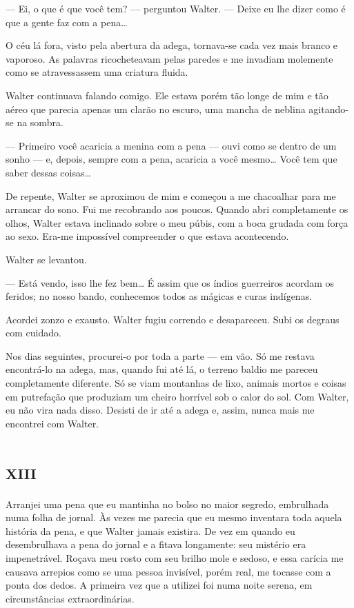 --- Ei, o que é que você tem? --- perguntou Walter. --- Deixe eu lhe dizer como é que a gente faz com a pena\ldots{}

O céu lá fora, visto pela abertura da adega, tornava-se cada vez mais branco e vaporoso. As palavras ricocheteavam pelas paredes e me invadiam molemente como se atravessassem uma criatura fluida.

Walter continuava falando comigo. Ele estava porém tão longe de mim e tão aéreo que parecia apenas um clarão no escuro, uma mancha de neblina agitando-se na sombra.

--- Primeiro você acaricia a menina com a pena --- ouvi como se dentro de um sonho --- e, depois, sempre com a pena, acaricia a você mesmo\ldots{} Você tem que saber dessas coisas\ldots{}

De repente, Walter se aproximou de mim e começou a me chacoalhar para me arrancar do sono. Fui me recobrando aos poucos. Quando abri completamente os olhos, Walter estava inclinado sobre o meu púbis, com a boca grudada com força ao sexo. Era-me impossível compreender o que estava acontecendo.

Walter se levantou.

--- Está vendo, isso lhe fez bem\ldots{} É assim que os índios guerreiros acordam os feridos; no nosso bando, conhecemos todos as mágicas e curas indígenas.

Acordei zonzo e exausto. Walter fugiu correndo e desapareceu. Subi os degraus com cuidado.

Nos dias seguintes, procurei-o por toda a parte --- em vão. Só me restava encontrá-lo na adega, mas, quando fui até lá, o terreno baldio me pareceu completamente diferente. Só se viam montanhas de lixo, animais mortos e coisas em putrefação que produziam um cheiro horrível sob o calor do sol. Com Walter, eu não vira nada disso. Desisti de ir até a adega e, assim, nunca mais me encontrei com Walter.


\chapter*{\huge\centering\textsc{xiii}}

Arranjei uma pena que eu mantinha no bolso no maior segredo, embrulhada numa folha de jornal. Às vezes me parecia que eu mesmo inventara toda aquela história da pena, e que Walter jamais existira. De vez em quando eu desembrulhava a pena do jornal e a fitava longamente: seu mistério era impenetrável. Roçava meu rosto com seu brilho mole e sedoso, e essa carícia me causava arrepios como se uma pessoa invisível, porém real, me tocasse com a ponta dos dedos. A primeira vez que a utilizei foi numa noite serena, em circunstâncias extraordinárias.

